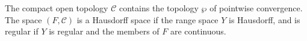 The compact open topology $\mathcal{C}$ contains the topology $\wp$ of pointwise convergence. The space $(F, \mathcal{C})$ is a Hausdorff space if the range space $Y$ is Hausdorff, and is regular if $Y$ is regular and the members of $F$ are continuous.
